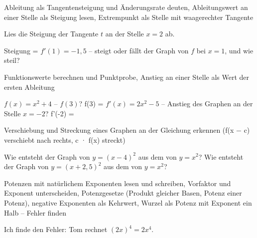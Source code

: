 \begin{aufgabe}{Ableitung als Tangentensteigung und Änderungsrate deuten, Ableitungswert an einer Stelle als Steigung lesen, Extrempunkt als Stelle mit waagerechter Tangente}
\begin{teile}
\teil Lies die Steigung der Tangente $t$ an der Stelle $x = 2$ ab.

\begin{ksys}[xmin=-1,xmax=5,ymin=-1,ymax=5,ablesen]   \end{ksys}
Steigung = \leerfeld
\teil $f'(1) = -1{,}5$ – steigt oder fällt der Graph von $f$ bei $x = 1$, und wie steil? \leerfeld
\end{teile}
\end{aufgabe}

\begin{aufgabe}{Funktionswerte berechnen und Punktprobe, Anstieg an einer Stelle als Wert der ersten Ableitung}
\begin{teile}
\teil $f(x) = x^2 + 4$ – $f(3)$? f(3) = \leerfeld
\teil $f'(x) = 2x^2 - 5$ – Anstieg des Graphen an der Stelle $x = -2$? f'(-2) = \leerfeld
\end{teile}
\end{aufgabe}

\begin{aufgabe}{Verschiebung und Streckung eines Graphen an der Gleichung erkennen (f(x − c) verschiebt nach rechts, c · f(x) streckt)}
\begin{teile}
\teil Wie entsteht der Graph von $y = (x - 4)^2$ aus dem von $y = x^2$? \leerfeld
\teil Wie entsteht der Graph von $y = (x + 2{,}5)^2$ aus dem von $y = x^2$? \leerfeld
\end{teile}
\end{aufgabe}

\begin{aufgabe}{Potenzen mit natürlichem Exponenten lesen und schreiben, Vorfaktor und Exponent unterscheiden, Potenzgesetze (Produkt gleicher Basen, Potenz einer Potenz), negative Exponenten als Kehrwert, Wurzel als Potenz mit Exponent ein Halb – Fehler finden}
\begin{teile}
\teil Ich finde den Fehler: Tom rechnet $(2x)^4 = 2x^4$.
\end{teile}
\end{aufgabe}

